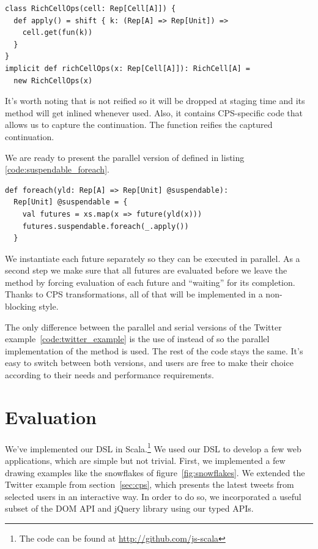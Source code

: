 \documentclass[runningheads,a4paper]{llncs}
\begin{document}
\begin{lstlisting}
class RichCellOps(cell: Rep[Cell[A]]) {
  def apply() = shift { k: (Rep[A] => Rep[Unit]) =>
    cell.get(fun(k))
  }
}
implicit def richCellOps(x: Rep[Cell[A]]): RichCell[A] =
  new RichCellOps(x)
\end{lstlisting}

It's worth noting that  is not reified so it will be dropped at staging time and its method will get inlined whenever used. Also, it contains CPS-specific code that allows us to capture the continuation. The  function reifies the captured continuation.

We are ready to present the parallel version of  defined in listing \ref{code:suspendable_foreach}.

\begin{lstlisting}
def foreach(yld: Rep[A] => Rep[Unit] @suspendable):
  Rep[Unit] @suspendable = {
    val futures = xs.map(x => future(yld(x)))
    futures.suspendable.foreach(_.apply())
  }
\end{lstlisting}

We instantiate each future separately so they can be executed in parallel. As a second step we make sure that all futures are evaluated before we leave the  method by forcing evaluation of each future and ``waiting'' for its completion. Thanks to CPS transformations, all of that will be implemented in a non-blocking style.

The only difference between the parallel and serial versions of the Twitter example~\ref{code:twitter_example} is the use of  instead of  so the parallel implementation of the  method is used. The rest of the code stays the same. It's easy to switch between both versions, and users are free to make their choice according to their needs and performance requirements.



\section{Evaluation}\label{sec:eval}

We've implemented our DSL in Scala.\footnote{The code can be found at
  \url{http://github.com/js-scala}} We used our DSL to
develop a few web applications, which are simple but not
trivial. First, we implemented a few drawing examples like the
snowflakes of figure~\ref{fig:snowflakes}. We extended the Twitter
example from section~\ref{sec:cps}, which presents the latest tweets
from selected users in an interactive way. In order to do so, we
incorporated a useful subset of the DOM API and jQuery library using our
typed APIs.
\end{document}

